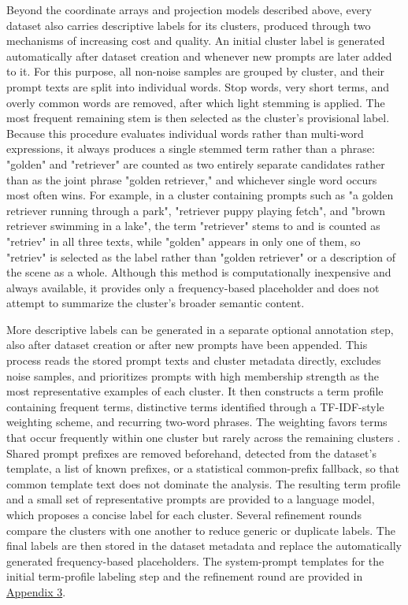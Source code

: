 Beyond the coordinate arrays and projection models described above, every dataset also carries descriptive labels for its clusters, produced through two mechanisms of increasing cost and quality.
An initial cluster label is generated automatically after dataset creation and whenever new prompts are later added to it. For this purpose, all non-noise samples are grouped by cluster, and their prompt texts are split into individual words. Stop words, very short terms, and overly common words are removed, after which light stemming is applied. The most frequent remaining stem is then selected as the cluster's provisional label. Because this procedure evaluates individual words rather than multi-word expressions, it always produces a single stemmed term rather than a phrase: "golden" and "retriever" are counted as two entirely separate candidates rather than as the joint phrase "golden retriever," and whichever single word occurs most often wins. For example, in a cluster containing prompts such as "a golden retriever running through a park", "retriever puppy playing fetch", and "brown retriever swimming in a lake", the term "retriever" stems to and is counted as "retriev" in all three texts, while "golden" appears in only one of them, so "retriev" is selected as the label rather than "golden retriever" or a description of the scene as a whole. Although this method is computationally inexpensive and always available, it provides only a frequency-based placeholder and does not attempt to summarize the cluster's broader semantic content.

More descriptive labels can be generated in a separate optional annotation step, also after dataset creation or after new prompts have been appended. This process reads the stored prompt texts and cluster metadata directly, excludes noise samples, and prioritizes prompts with high membership strength as the most representative examples of each cluster. It then constructs a term profile containing frequent terms, distinctive terms identified through a TF-IDF-style weighting scheme, and recurring two-word phrases. The weighting favors terms that occur frequently within one cluster but rarely across the remaining clusters \cite{saltonbuckley1987termweighting}. Shared prompt prefixes are removed beforehand, detected from the dataset's template, a list of known prefixes, or a statistical common-prefix fallback, so that common template text does not dominate the analysis. The resulting term profile and a small set of representative prompts are provided to a language model, which proposes a concise label for each cluster. Several refinement rounds compare the clusters with one another to reduce generic or duplicate labels. The final labels are then stored in the dataset metadata and replace the automatically generated frequency-based placeholders. The system-prompt templates for the initial term-profile labeling step and the refinement round are provided in \hyperref[app:3-dataset-annotation]{Appendix 3}.

